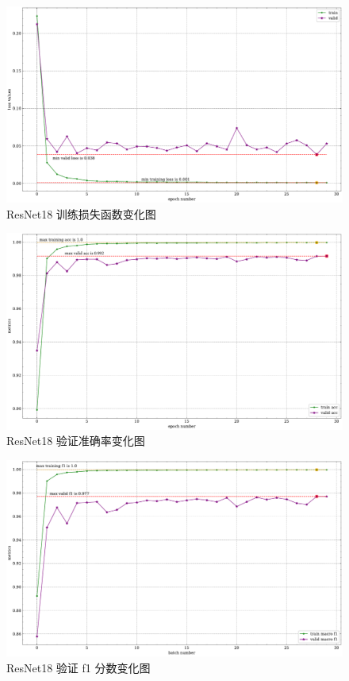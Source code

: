 \documentclass[supercite]{Experimental_Report}
\theoremstyle{definition}
\begin{document}
\begin{figure}[H]
	\begin{center}
		\includegraphics[scale=0.45]{../images/ResNet18训练验证损失函数.pdf}
		\caption{ResNet18 训练损失函数变化图}
		\label{ResNet18训练验证损失函数}
	\end{center}
\end{figure}
\begin{figure}[H]
	\begin{center}
		\includegraphics[scale=0.4]{../images/ResNet18训练验证acc.pdf}
		\caption{ResNet18 验证准确率变化图}
		\label{ResNet18训练验证acc}
	\end{center}
\end{figure}
\begin{figure}[H]
	\begin{center}
		\includegraphics[scale=0.4]{../images/ResNet18训练验证f1.pdf}
		\caption{ResNet18 验证 f1 分数变化图}
		\label{ResNet18训练验证f1}
	\end{center}
\end{figure}
\end{document}
